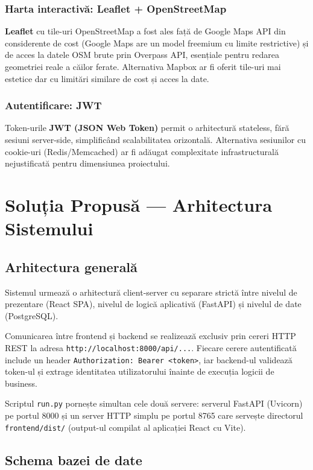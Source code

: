 \documentclass[12pt,a4paper]{report}
\begin{document}
\subsection{Harta interactivă: Leaflet + OpenStreetMap}

\textbf{Leaflet} cu tile-uri OpenStreetMap a fost ales față de Google Maps API din considerente de cost (Google Maps are un model freemium cu limite restrictive) și de acces la datele OSM brute prin Overpass API, esențiale pentru redarea geometriei reale a căilor ferate. Alternativa Mapbox ar fi oferit tile-uri mai estetice dar cu limitări similare de cost și acces la date.

\subsection{Autentificare: JWT}

Token-urile \textbf{JWT (JSON Web Token)} permit o arhitectură stateless, fără sesiuni server-side, simplificând scalabilitatea orizontală. Alternativa sesiunilor cu cookie-uri (Redis/Memcached) ar fi adăugat complexitate infrastructurală nejustificată pentru dimensiunea proiectului.


\chapter{Soluția Propusă — Arhitectura Sistemului}

\section{Arhitectura generală}

Sistemul urmează o arhitectură client-server cu separare strictă între nivelul de prezentare (React SPA), nivelul de logică aplicativă (FastAPI) și nivelul de date (PostgreSQL).

Comunicarea între frontend și backend se realizează exclusiv prin cereri HTTP REST la adresa \texttt{http://localhost:8000/api/...}. Fiecare cerere autentificată include un header \texttt{Authorization: Bearer <token>}, iar backend-ul validează token-ul și extrage identitatea utilizatorului înainte de execuția logicii de business.

Scriptul \texttt{run.py} pornește simultan cele două servere: serverul FastAPI (Uvicorn) pe portul 8000 și un server HTTP simplu pe portul 8765 care servește directorul \texttt{frontend/dist/} (output-ul compilat al aplicației React cu Vite).

\section{Schema bazei de date}
\end{document}
